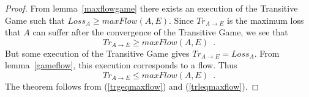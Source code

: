 \begin{proof}%
   From lemma~\ref{maxflowgame} there exists an execution of the Transitive Game such that
   $Loss_A \geq maxFlow\left(A, E\right)$.
   Since $Tr_{A \rightarrow E}$ is the maximum loss that $A$ can suffer after the convergence of the Transitive Game, we
   see that
   \begin{equation}
   \label{trgeqmaxflow}
      Tr_{A \rightarrow E} \geq maxFlow\left(A, E\right) \enspace.
   \end{equation}
   But some execution of the Transitive Game gives $Tr_{A \rightarrow E} = Loss_A$.
   From lemma~\ref{gameflow}, this execution corresponds to a flow. Thus
   \begin{equation}
   \label{trleqmaxflow}
      Tr_{A \rightarrow E} \leq maxFlow\left(A, E\right) \enspace.
   \end{equation}
   The theorem follows from (\ref{trgeqmaxflow}) and (\ref{trleqmaxflow}).
\end{proof}
